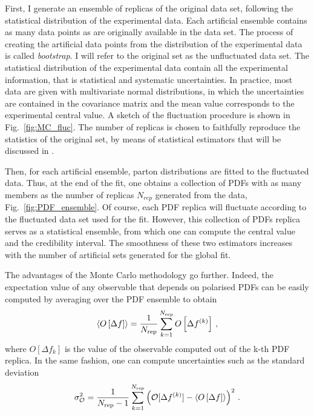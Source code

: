 First, I generate an ensemble of replicas of the original data set, following the statistical distribution of the experimental data. Each artificial ensemble contains as many data points as are originally available in the data set. The process of creating the artificial data points from the distribution of the experimental data is called \textit{bootstrap}. I will refer to the original set as the unfluctuated data set. The statistical distribution of the experimental data contain all the experimental information, that is statistical and systematic uncertainties. In practice, most data are given with multivariate normal distributions, in which the uncertainties are contained in the covariance matrix and the mean value corresponds to the experimental central value. A sketch of the fluctuation procedure is shown in Fig.~\ref{fig:MC_fluc}. The number of replicas is chosen to faithfully reproduce the statistics of the original set, by means of statistical estimators that will be discussed in .%

Then, for each artificial ensemble, parton distributions are fitted to the fluctuated data. Thus, at the end of the fit, one obtains a collection of PDFs with as many members as the number of replicas $N_{rep}$ generated from the data, Fig.~\ref{fig:PDF_ensemble}. Of course, each PDF replica will fluctuate according to the fluctuated data set used for the fit. However, this collection of PDFs replica serves as a statistical ensemble, from which one can compute the central value and the credibility interval. The smoothness of these two estimators increases with the number of artificial sets generated for the global fit.%
 
The advantages of the Monte Carlo methodology go further. Indeed, the expectation value of any observable that depends on polarised PDFs can be easily computed by averaging over the PDF ensemble to obtain
\begin{equation}
  \left< O\left[ \Delta f \right] \right> = \frac{1}{N_{\textrm{rep}}} \sum_{k=1}^{N_{\textrm{rep}}} O\left[\Delta f^{(k)}\right] \,,
\end{equation}
where $O\left[\Delta f_k\right]$ is the value of the observable computed out of the k-th PDF replica. In the same fashion, one can compute uncertainties such as the standard deviation
\begin{equation}
  \sigma_{\mathcal{O}}^2 = \frac{1}{N_{\textrm{rep}}-1} \sum_{k=1}^{N_{\textrm{rep}}} \left( \mathcal{O}[\Delta f^{(k)}] - \left< O\left[ \Delta f \right] \right> \right)^2 \,.
\end{equation}
